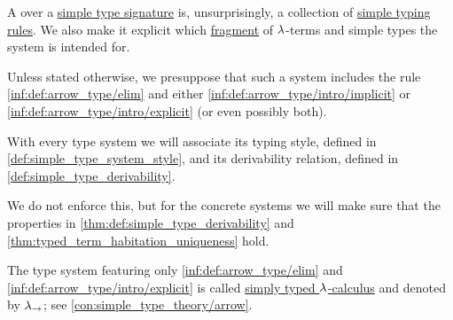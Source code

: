 \begin{definition}\label{def:simple_type_system}\mimprovised
  A  over a \hyperref[def:simple_type_signature]{simple type signature} is, unsurprisingly, a collection of \hyperref[def:simple_typing_rule]{simple typing rules}. We also make it explicit which \hyperref[con:syntax_fragment]{fragment} of \( {\mathrm \lambda} \)-terms and simple types the system is intended for.

  Unless stated otherwise, we presuppose that such a system includes the rule \ref{inf:def:arrow_type/elim} and either \ref{inf:def:arrow_type/intro/implicit} or \ref{inf:def:arrow_type/intro/explicit} (or even possibly both).
\end{definition}
\begin{comments}
  \item With every type system we will associate its typing style, defined in \cref{def:simple_type_system_style}, and its derivability relation, defined in \cref{def:simple_type_derivability}.

  \item We do not enforce this, but for the concrete systems we will make sure that the properties in \cref{thm:def:simple_type_derivability} and \cref{thm:typed_term_habitation_uniqueness} hold.

  \item The type system featuring only \ref{inf:def:arrow_type/elim} and \ref{inf:def:arrow_type/intro/explicit} is called \hyperref[con:simple_type_theory/arrow]{simply typed \( {\mathrm \lambda} \)-calculus} and denoted by \( {\mathrm \lambda}_{\rightarrow} \); see \cref{con:simple_type_theory/arrow}.
\end{comments}

